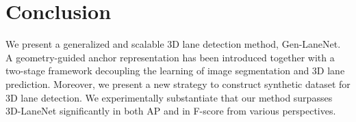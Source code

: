 \documentclass[10pt,twocolumn,letterpaper]{article}
\begin{document}
\begin{comment}
\begin{table}[h!]
    {\small
    \centering
    \begin{tabular}{|c|c|c|c|}
        \hline
        \backslashbox{Method}{Metric}           & F-score & AP-1 & AP-2 \\
        \hline
        3D-LaneNet                              & 0.725 & 0.749 & 0.502 \\
        \hline
        {\color{blue}3D-LaneNet (extend)}       & 0.827 & 0.848 & 0.647 \\
        \hline
        3D-GeoNet                               & 0.838 & 0.863 & 0.770 \\
        \hline
        {\color{blue}3D-GeoNet (extend)}        & 0.902 & 0.923 & 0.855 \\
        \hline
        Gen-LaneNet                             & 0.809 & 0.838 & 0.718 \\
        \hline
        {\color{blue}Gen-LaneNet (extend)}      & 0.853 & 0.872 & 0.746 \\
        \hline
    \end{tabular}
    \caption{Comparison of methods under the illumination change.}
    \label{tab:overall:compare:illum}
    }
\end{table}

\end{comment}

\section{Conclusion}
\label{sec:discuss}
We present a generalized and scalable 3D lane detection method, Gen-LaneNet. A geometry-guided anchor representation has been introduced together with a two-stage framework decoupling the learning of image segmentation and 3D lane prediction. Moreover, we present a new strategy to construct synthetic dataset for 3D lane detection. We experimentally substantiate that our method surpasses 3D-LaneNet significantly in both AP and in F-score from various perspectives.



\newpage
{\small


}
\end{document}
